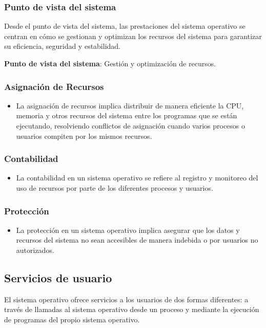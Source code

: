 \subsubsection{Punto de vista del sistema}
Desde el punto de vista del sistema, las prestaciones del sistema operativo se centran en cómo se gestionan y optimizan los recursos del sistema para garantizar su eficiencia, seguridad y estabilidad. 
\begin{tcolorbox}
	\textbf{Punto de vista del sistema}: Gestión y optimización de recursos.
	
	\subsubsection{Asignación de Recursos}
	\begin{itemize}
		\item La asignación de recursos implica distribuir de manera eficiente la CPU, memoria y otros recursos del sistema entre los programas que se están ejecutando, resolviendo conflictos de asignación cuando varios procesos o usuarios compiten por los mismos recursos.
	\end{itemize}
	
	\subsubsection{Contabilidad}
	\begin{itemize}
		\item La contabilidad en un sistema operativo se refiere al registro y monitoreo del uso de recursos por parte de los diferentes procesos y usuarios.
	\end{itemize}
	
	\subsubsection{Protección}
	\begin{itemize}
		\item La protección en un sistema operativo implica asegurar que los datos y recursos del sistema no sean accesibles de manera indebida o por usuarios no autorizados.
	\end{itemize}
	
\end{tcolorbox}

\subsection{Servicios de usuario}
El sistema operativo ofrece servicios a los usuarios de dos formas diferentes: a través de llamadas al sistema operativo desde un proceso y mediante la ejecución de programas del propio sistema operativo. 

